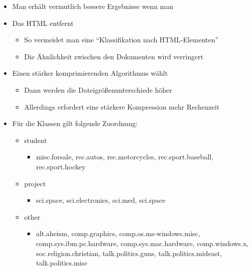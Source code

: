 \begin{frame}[c]
\begin{itemize}
  \item Man erhält vermutlich bessere Ergebnisse wenn man
  \item Das HTML entfernt
  \begin{itemize}
  \item So vermeidet man eine ``Klassifikation nach HTML-Elementen''
  \item Die Ähnlichkeit zwischen den Dokumenten wird verringert
\end{itemize}
\item Einen stärker komprimierenden Algorithmus wählt
\begin{itemize}
  \item Dann werden die Dateigrößenunterschiede höher
  \item Allerdings erfordert eine stärkere Kompression mehr Rechenzeit
\end{itemize}
\end{itemize}
\end{frame}

\begin{frame}[c]
\begin{itemize}
  \item Für die Klassen gilt folgende Zuordnung:
  \begin{itemize}
  \item student
  \begin{itemize}
  \item misc.forsale, rec.autos, 
  rec.motorcycles, rec.sport.baseball, rec.sport.hockey
\end{itemize}
  \item project
  \begin{itemize}
  \item sci.space, sci.electronics, sci.med, sci.space
\end{itemize}
  \item other
  \begin{itemize}
  \item alt.aheism, comp.graphics, comp.os.ms-windows.misc,
  comp.sys.ibm.pc.hardware, comp.sys.mac.hardware, comp.windows.x, soc.religion.christian, talk.politics.guns, talk.politics.mideast, talk.politics.misc
\end{itemize}
\end{itemize}
\end{itemize}
\end{frame}


